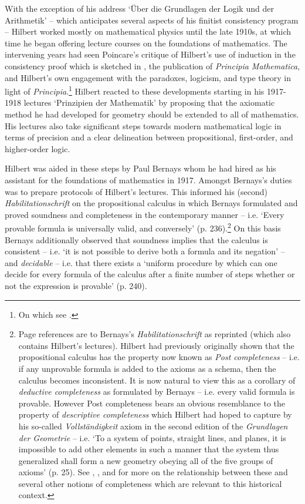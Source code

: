 \documentclass[11pt,fleqn,leqno]{article}
\begin{document}
With the exception of his \citeyearpar{Hilbert1904} address `\"Uber die Grundlagen der Logik und der Arithmetik' -- which anticipates several aspects of his finitist consistency program  -- Hilbert worked mostly on mathematical physics until the late 1910s, at which time he began offering lecture courses on the foundations of mathematics.   The intervening years had seen Poincare's critique of Hilbert's use of induction in the consistency proof which is sketched in \citeyearpar{Hilbert1904}, the publication of \textsl{Principia Mathematica}, and Hilbert's own engagement with the paradoxes, logicism, and type theory in light of \textsl{Principia}.\footnote{On which see \citep{Mancosu2003}.}   Hilbert reacted to these developments starting in his 1917-1918 lectures  `Prinzipien der Mathematik' by proposing that the axiomatic method he had developed for geometry should be extended to all of mathematics.  His lectures also take significant steps towards modern mathematical logic in terms of precision and a clear delineation between propositional, first-order, and higher-order logic.  

Hilbert was aided in these steps by Paul Bernays whom he had hired as his assistant for the foundations of mathematics in 1917.   Amongst Bernays's duties was to prepare protocols of Hilbert's lectures.  This informed his (second) \textsl{Habilitationschrift} \citeyearpar{Bernays1918a} on the propositional calculus in which Bernays formulated and proved soundness and completeness in the contemporary manner -- i.e. `Every provable formula is universally valid, and conversely' (p. 236).\footnote{Page references are to Bernays's \textsl{Habilitationschrift} as reprinted \citep{Hilbert2013} (which also contains Hilbert's lectures).   Hilbert had previously originally shown that the propositional calculus has the property now known as \textsl{Post completeness} -- i.e. if any unprovable formula is added to the axioms as a schema, then the calculus becomes inconsistent.   It is now natural to view this as a corollary of \textsl{deductive completeness} as formulated by Bernays -- i.e. every valid formula is provable.  However Post completeness bears an obvious resemblance to the property of \textsl{descriptive completeness}  which Hilbert had hoped to capture by his so-called \textsl{Vollst\"andigkeit} axiom in the second edition of the \textsl{Grundlagen der Geometrie} -- i.e. `To a system of points, straight lines, and planes, it is impossible to add other elements in such a manner that the system thus generalized shall form a new geometry obeying all of the five groups of axioms' (p. 25).   See \citep{Zach1999}, \citep{Detlefsen2014a}, and \citep[\S 11]{Baldwin2018} for more on the relationship between these and several other notions of completeness which are relevant to this historical context.} On this basis Bernays additionally observed that soundness implies that the calculus is consistent -- i.e. `it is not possible to derive both a formula and its negation' -- and \textsl{decidable} -- i.e. that there exists a `uniform procedure by which can one decide for every formula of the calculus after a finite number of steps whether or not the expression is provable' (p. 240).  
\end{document}
